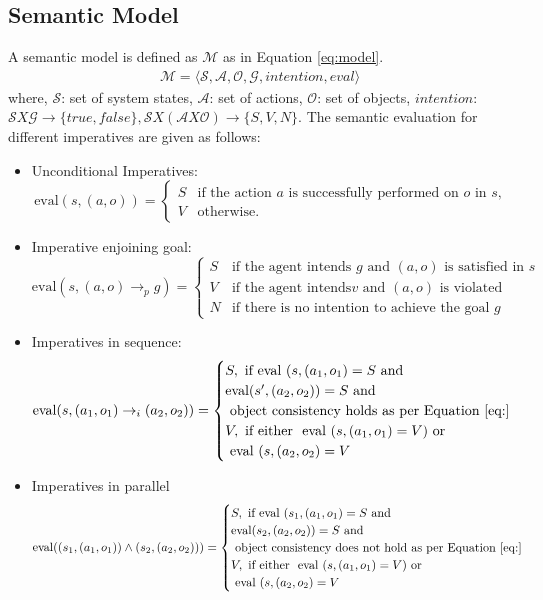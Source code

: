 \documentclass[a4paper,11pt]{lmcs}
\begin{document}
\subsection{Semantic Model}
A semantic model is defined as $\mathcal{M}$ as in Equation \ref{eq:model}.
\begin{eqnarray}
 \label{eq:model}
 \mathcal{M} = \langle{\mathcal{S},\mathcal{A},  \mathcal{O}, \mathcal{G}, intention, eval \rangle}
\end{eqnarray}
where,
$\mathcal{S}$: set of system states, $\mathcal{A}$: set of actions, $\mathcal{O}$: set of objects, $intention$: $\mathcal{S} X \mathcal{G} \rightarrow \{true,false\}, \mathcal{S} X (\mathcal{A} X \mathcal{O}) \rightarrow \{S,V,N\} $.
The semantic evaluation for different imperatives are given as follows:
\begin{itemize}
 \item  Unconditional Imperatives: \[
\text{eval}(s, (a, o)) =
\begin{cases}
S & \text{if the action $a$ is successfully performed on $o$ in $s$}, \\
V & \text{otherwise}.
\end{cases}
\]

\item Imperative enjoining goal: \[
\text{eval}(s, (a, o) \rightarrow_p g) =
\begin{cases}
S & \text{if the agent intends } g \text{ and } (a,o) \text{ is satisfied in } s \\
V & \text{if the agent intends} v \text{ and } (a,o) \text{ is violated}  \\
N & \text{if there is no intention to achieve the goal } g
\end{cases}
\]

\item Imperatives in sequence:
\[
\text{eval}(s, (a_1, o_1) \rightarrow_i (a_2,o_2)) =
\begin{cases}
S,  \text{ if} \text{ eval }(s, (a_1,o_1) = S \text{ and}\\  \text{eval} (s', (a_2,o_2)) = S \text{ and} \\  \text{ object consistency holds as per Equation \ref{eq:}} \\ V, \text{ if either }  \text{ eval }(s, (a_1,o_1) = V) \text{ or }  \\ \text{ eval }(s, (a_2,o_2) = V
\end{cases}
\]

\item Imperatives in parallel
\[
\text{eval}((s_1, (a_1, o_1)) \wedge (s_2,(a_2,o_2))) =
\begin{cases}
S,  \text{ if} \text{ eval }(s_1, (a_1,o_1) = S \text{ and}\\  \text{eval} (s_2, (a_2,o_2)) = S \text{ and} \\  \text{ object consistency does not hold as per Equation \ref{eq:}} \\ V, \text{ if either }  \text{ eval }(s, (a_1,o_1) = V) \text{ or }  \\ \text{ eval }(s, (a_2,o_2) = V
\end{cases}
\]


\end{itemize}
\end{document}
